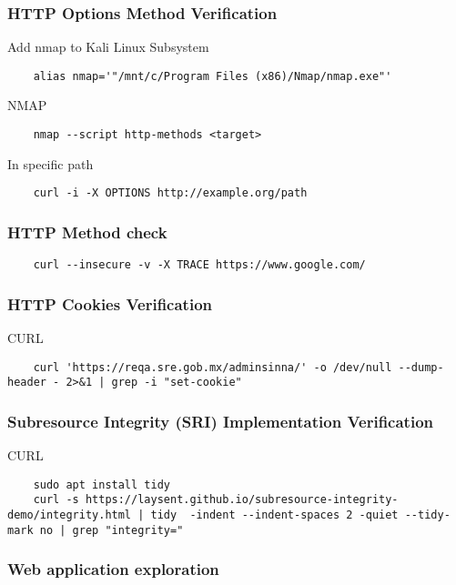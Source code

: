 \documentclass[letterpaper,12pt]{extarticle}
\begin{document}
\subsubsection{HTTP Options Method Verification}

Add nmap to Kali Linux Subsystem
\begin{verbatim}
	alias nmap='"/mnt/c/Program Files (x86)/Nmap/nmap.exe"'
\end{verbatim}

NMAP
\begin{verbatim}
	nmap --script http-methods <target>
\end{verbatim}

In specific path
\begin{verbatim}
	curl -i -X OPTIONS http://example.org/path
\end{verbatim}

\subsubsection{HTTP Method check}

\begin{verbatim}
	curl --insecure -v -X TRACE https://www.google.com/
\end{verbatim}

\subsubsection{HTTP Cookies Verification}

CURL
\begin{verbatim}
	curl 'https://reqa.sre.gob.mx/adminsinna/' -o /dev/null --dump-header - 2>&1 | grep -i "set-cookie"
\end{verbatim}

\subsubsection{Subresource Integrity (SRI)  Implementation Verification}

CURL
\begin{verbatim}
	sudo apt install tidy
	curl -s https://laysent.github.io/subresource-integrity-demo/integrity.html | tidy  -indent --indent-spaces 2 -quiet --tidy-mark no | grep "integrity="
\end{verbatim}

\subsubsection{Web application exploration}
\end{document}
